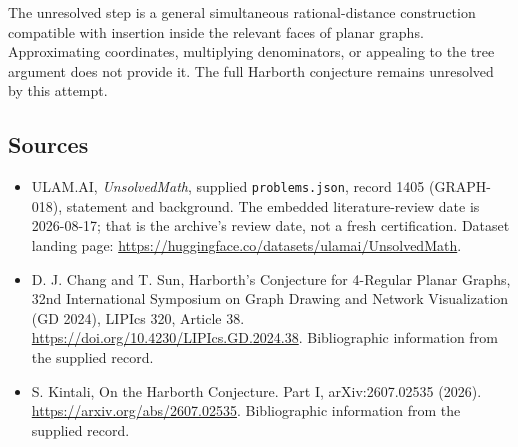 \documentclass[11pt,a4paper]{article}
\begin{document}
The unresolved step is a general simultaneous rational-distance construction compatible with insertion inside the relevant faces of planar graphs. Approximating coordinates, multiplying denominators, or appealing to the tree argument does not provide it. The full Harborth conjecture remains unresolved by this attempt.

\subsection{Sources}

{\small

\begin{itemize}

\item[\hypertarget{source:1405:1}{S1}] ULAM.AI, \emph{UnsolvedMath}, supplied \texttt{problems.json}, record 1405 (GRAPH-018), statement and background. The embedded literature-review date is 2026-08-17; that is the archive’s review date, not a fresh certification. Dataset landing page: \url{https://huggingface.co/datasets/ulamai/UnsolvedMath}.

\item[\hypertarget{source:1405:2}{S2}] D. J. Chang and T. Sun, Harborth's Conjecture for 4-Regular Planar Graphs, 32nd International Symposium on Graph Drawing and Network Visualization (GD 2024), LIPIcs 320, Article 38. \url{https://doi.org/10.4230/LIPIcs.GD.2024.38}. Bibliographic information from the supplied record.

\item[\hypertarget{source:1405:3}{S3}] S. Kintali, On the Harborth Conjecture. Part I, arXiv:2607.02535 (2026). \url{https://arxiv.org/abs/2607.02535}. Bibliographic information from the supplied record.

\end{itemize}

}

\label{end:1405}
\end{document}
